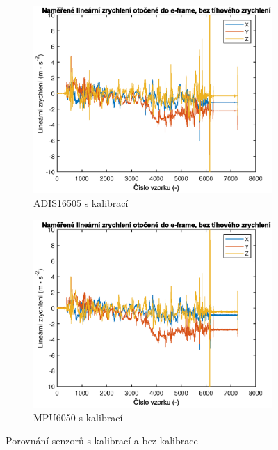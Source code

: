 \begin{figure}[h]
     
     \centering
     \begin{subfigure}[b]{0.49\textwidth}
         \centering
         \includegraphics[width=\textwidth]{obrazky/matlab/1adisWithCal}
         \caption{ADIS16505 s kalibrací}   
         \label{fig:AdisWithCal}  
     \end{subfigure}
     \hfill
     \centering
     \begin{subfigure}[b]{0.49\textwidth}
         \centering
         \includegraphics[width=\textwidth]{obrazky/matlab/1mpuWithCal}
         \caption{MPU6050 s kalibrací}   
         \label{fig:mpuWithCal}  
     \end{subfigure}
        \caption{Porovnání senzorů s kalibrací a bez kalibrace}
        \label{fig:calibrationComp}
\end{figure}

